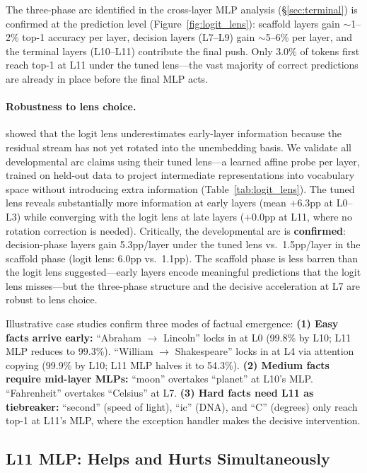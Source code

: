 \documentclass{article}
\begin{document}
The three-phase arc identified in the cross-layer MLP analysis
(\S\ref{sec:terminal}) is confirmed at the prediction level
(Figure~\ref{fig:logit_lens}):
scaffold layers gain $\sim$1--2\% top-1 accuracy per layer,
decision layers (L7--L9) gain $\sim$5--6\% per layer, and the terminal
layers (L10--L11) contribute the final push.
Only 3.0\% of tokens first reach top-1 at L11 under the tuned lens---the vast
majority of correct predictions are already in place before the final MLP acts.

\paragraph{Robustness to lens choice.}
\citet{belrose2023eliciting} showed that the logit lens underestimates early-layer
information because the residual stream has not yet rotated into the unembedding
basis.
We validate all developmental arc claims using their tuned lens---a learned affine
probe per layer, trained on held-out data to project intermediate representations
into vocabulary space without introducing extra information
(Table~\ref{tab:logit_lens}).
The tuned lens reveals substantially more information at early layers
(mean $+$6.3pp at L0--L3) while converging with the logit lens at late layers
($+$0.0pp at L11, where no rotation correction is needed).
Critically, the developmental arc is \textbf{confirmed}: decision-phase layers
gain 5.3pp/layer under the tuned lens vs.\ 1.5pp/layer in the scaffold phase
(logit lens: 6.0pp vs.\ 1.1pp).
The scaffold phase is less barren than the logit lens suggested---early layers
encode meaningful predictions that the logit lens misses---but the three-phase
structure and the decisive acceleration at L7 are robust to lens choice.

Illustrative case studies confirm three modes of factual emergence:
\textbf{(1) Easy facts arrive early:}
``Abraham $\to$ Lincoln'' locks in at L0 (99.8\% by L10; L11 MLP reduces to 99.3\%).
``William $\to$ Shakespeare'' locks in at L4 via attention copying (99.9\% by L10;
L11 MLP halves it to 54.3\%).
\textbf{(2) Medium facts require mid-layer MLPs:}
``moon'' overtakes ``planet'' at L10's MLP.
``Fahrenheit'' overtakes ``Celsius'' at L7.
\textbf{(3) Hard facts need L11 as tiebreaker:}
``second'' (speed of light), ``ic'' (DNA), and ``C'' (degrees) only reach top-1
at L11's MLP, where the exception handler makes the decisive intervention.

\subsection{L11 MLP: Helps and Hurts Simultaneously}
\end{document}
